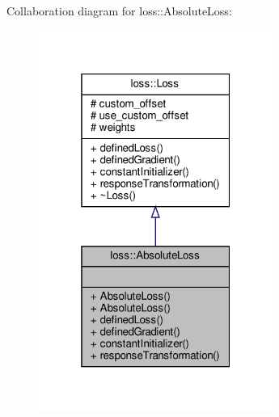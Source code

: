Collaboration diagram for loss\+:\+:Absolute\+Loss\+:\nopagebreak
\begin{figure}[H]
\begin{center}
\leavevmode
\includegraphics[width=217pt]{classloss_1_1_absolute_loss__coll__graph}
\end{center}
\end{figure}
